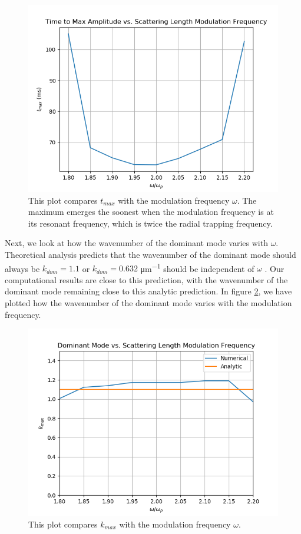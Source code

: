 \documentclass[12]{article}
\begin{document}
\begin{figure}[b]
\centering
\includegraphics[scale=0.9]{tmaxExpUnits}
\caption{This plot compares $t_{max}$ with the modulation frequency $\omega$. The maximum emerges the soonest when the modulation frequency is at its resonant frequency, which is twice the radial trapping frequency.}
\label{fig:tmaxExp}
\end{figure}

Next, we look at how the wavenumber of the dominant mode varies with $\omega$. Theoretical analysis predicts that the wavenumber of the dominant mode should always be $k_{dom} = 1.1$ or $k_{dom} = 0.632$ \si{\micro\meter^{-1}} should be independent of $\omega$ \cite{mustafa}. Our computational results are close to this prediction, with the wavenumber of the dominant mode remaining close to this analytic prediction. In figure \ref{fig:kmaxNat}, we have plotted how the wavenumber of the dominant mode varies with the modulation frequency. 

\begin{figure}[H]
\centering
\includegraphics[scale=0.9]{kmaxNatUnits}
\caption{This plot compares $k_{max}$ with the modulation frequency $\omega$.}
\label{fig:kmaxNat}
\end{figure}
\end{document}
